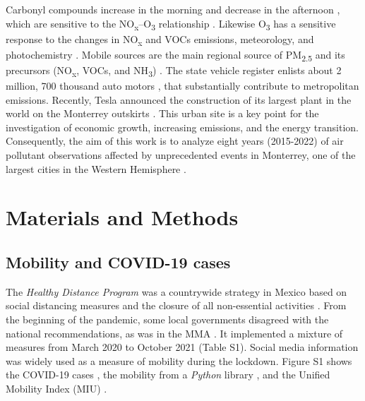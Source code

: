 \documentclass[preprint,12pt]{elsarticle}
\begin{document}
Carbonyl compounds increase in the morning and decrease in the afternoon \citep{j2012}, which are sensitive to the NO\textsubscript{x}--O\textsubscript{3} relationship \citep{Menchaca_Torre_2015a}. Likewise O\textsubscript{3} has a sensitive response to the changes in NO\textsubscript{x} and VOCs emissions, meteorology, and photochemistry \citep{Hern_ndez_Paniagua_2017}. Mobile sources are the main regional source of PM\textsubscript{2.5} and its precursors (NO\textsubscript{x}, VOCs, and NH\textsubscript{3}) \citep{Martínez-Cinco2016}. The state vehicle register enlists about 2 million, 700 thousand auto motors \citep{len}, that substantially contribute to metropolitan emissions. Recently, Tesla announced the construction of its largest plant in the world on the Monterrey outskirts \citep{tesla_2023}. This urban site is a key point for the investigation of economic growth, increasing emissions, and the energy transition. Consequently, the aim of this work is to analyze eight years (2015-2022) of air pollutant observations affected by unprecedented events in Monterrey, one of the largest cities in the Western Hemisphere \citep{Ni_2023}.
\section*{Materials and Methods}
\subsection*{Mobility and COVID-19 cases}
The \emph{Healthy Distance Program} was a countrywide strategy in Mexico based on social distancing measures and the closure of all non-essential activities \citep{covid-19a}. From the beginning of the pandemic, some local governments disagreed with the national recommendations, as was in the MMA \citep{state}. It implemented a mixture of measures from March 2020 to October 2021 (Table S1). Social media information was widely used as a measure of mobility during the lockdown. Figure S1 shows the COVID-19 cases \citep{covid19mex}, the mobility from a \emph{Python} library \citep{Graff_2022}, and the Unified Mobility Index (MIU) \citep{conacyt}.
\end{document}
